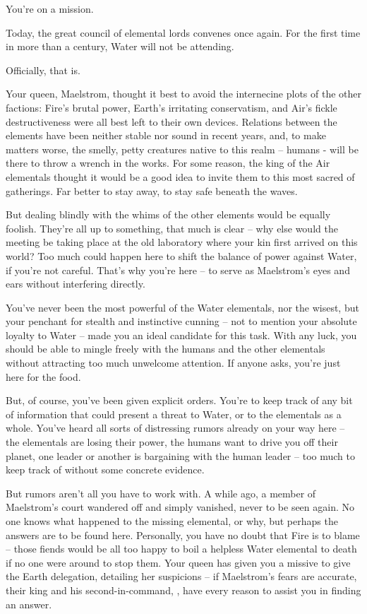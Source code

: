 \documentclass[char]{elementals}
\begin{document}
\name{\cMiniWater{}}


You're on a mission. 

Today, the great council of elemental lords convenes once again. For the first time in more than a century, Water will not be attending.

Officially, that is.

Your queen, Maelstrom, thought it best to avoid the internecine plots of the other factions: Fire's brutal power, Earth's irritating conservatism, and Air's fickle destructiveness were all best left to their own devices. Relations between the elements have been neither stable nor sound in recent years, and, to make matters worse, the smelly, petty creatures native to this realm -- humans - will be there to throw a wrench in the works. For some reason, the king of the Air elementals thought it would be a good idea to invite them to this most sacred of gatherings. Far better to stay away, to stay safe beneath the waves.

But dealing blindly with the whims of the other elements would be equally foolish. They're all up to something, that much is clear -- why else would the meeting be taking place at the old laboratory where your kin first arrived on this world? Too much could happen here to shift the balance of power against Water, if you're not careful. That's why you're here -- to serve as Maelstrom's eyes and ears without interfering directly.

You've never been the most powerful of the Water elementals, nor the wisest, but your penchant for stealth and instinctive cunning -- not to mention your absolute loyalty to Water -- made you an ideal candidate for this task. With any luck, you should be able to mingle freely with the humans and the other elementals without attracting too much unwelcome attention. If anyone asks, you're just here for the food.

But, of course, you've been given explicit orders. You're to keep track of any bit of information that could present a threat to Water, or to the elementals as a whole. You've heard all sorts of distressing rumors already on your way here -- the elementals are losing their power, the humans want to drive you off their planet, one leader or another is bargaining with the human leader -- too much to keep track of without some concrete evidence.

But rumors aren't all you have to work with. A while ago, a member of Maelstrom's court wandered off and simply vanished, never to be seen again. No one knows what happened to the missing elemental, or why, but perhaps the answers are to be found here. Personally, you have no doubt that Fire is to blame -- those fiends would be all too happy to boil a helpless Water elemental to death if no one were around to stop them. Your queen has given you a missive to give the Earth delegation, detailing her suspicions -- if Maelstrom's fears are accurate, their king and his second-in-command, \cLoyal{\intro}, have every reason to assist you in finding an answer. 
\end{document}
